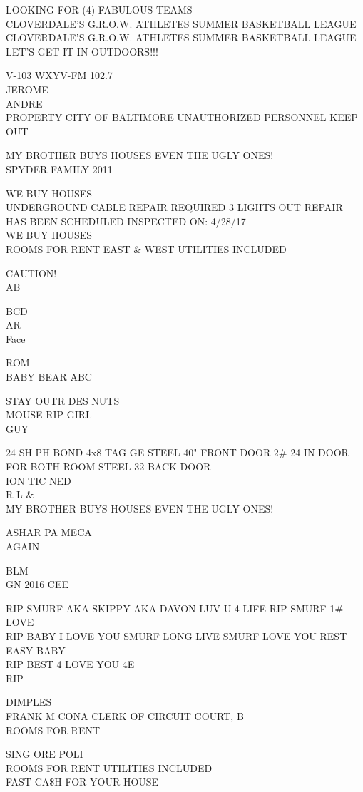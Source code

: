 \documentclass[10pt,letterpaper]{article}
\begin{document}
LOOKING FOR (4) FABULOUS TEAMS\\
CLOVERDALE'S G.R.O.W. ATHLETES SUMMER BASKETBALL LEAGUE\\
CLOVERDALE'S G.R.O.W. ATHLETES SUMMER BASKETBALL LEAGUE LET'S GET IT IN OUTDOORS!!!

V{-}103 WXYV{-}FM 102.7\\
JEROME\\
ANDRE\\
PROPERTY CITY OF BALTIMORE UNAUTHORIZED PERSONNEL KEEP OUT

MY BROTHER BUYS HOUSES EVEN THE UGLY ONES!\\
SPYDER FAMILY 2011

WE BUY HOUSES\\
UNDERGROUND CABLE REPAIR REQUIRED 3 LIGHTS OUT REPAIR HAS BEEN SCHEDULED INSPECTED ON: 4/28/17\\
WE BUY HOUSES\\
ROOMS FOR RENT EAST \& WEST UTILITIES INCLUDED

CAUTION!\\
AB

BCD\\
AR\\
Face

ROM\\
BABY BEAR ABC

STAY OUTR DES NUTS\\
MOUSE RIP GIRL\\
GUY

24 SH PH BOND 4x8 TAG GE STEEL 40" FRONT DOOR 2\# 24 IN DOOR FOR BOTH ROOM STEEL 32 BACK DOOR\\
ION TIC NED\\
R L \&\\
MY BROTHER BUYS HOUSES EVEN THE UGLY ONES!

ASHAR PA MECA\\
AGAIN

BLM\\
GN 2016 CEE

RIP SMURF AKA SKIPPY AKA DAVON LUV U 4 LIFE RIP SMURF 1\# LOVE\\
RIP BABY I LOVE YOU SMURF LONG LIVE SMURF LOVE YOU REST EASY BABY\\
RIP BEST 4 LOVE YOU 4E\\
RIP

DIMPLES\\
FRANK M CONA CLERK OF CIRCUIT COURT, B\\
ROOMS FOR RENT

SING ORE POLI\\
ROOMS FOR RENT UTILITIES INCLUDED\\
FAST CA\$H FOR YOUR HOUSE
\
\end{document}
